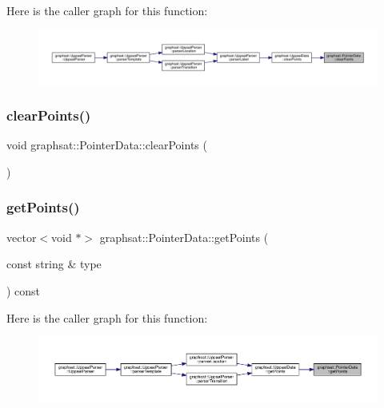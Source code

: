 Here is the caller graph for this function\+:\nopagebreak
\begin{figure}[H]
\begin{center}
\leavevmode
\includegraphics[width=350pt]{classgraphsat_1_1_pointer_data_ac609e904c48f7cc8b136eb5208bd5ffe_icgraph}
\end{center}
\end{figure}
\mbox{\label{classgraphsat_1_1_pointer_data_a2ccca7ec8ce9b07103b8796a3ed4dfec}} 
\subsubsection{\texorpdfstring{clearPoints()}{clearPoints()}\hspace{0.1cm}{\footnotesize\ttfamily [2/2]}}
{\footnotesize\ttfamily void graphsat\+::\+Pointer\+Data\+::clear\+Points (\begin{DoxyParamCaption}{ }\end{DoxyParamCaption})\hspace{0.3cm}{\ttfamily [inline]}}

\mbox{\label{classgraphsat_1_1_pointer_data_a5a5b4d08a9a16220e22e244c45f320bd}} 
\subsubsection{\texorpdfstring{getPoints()}{getPoints()}}
{\footnotesize\ttfamily vector$<$void $\ast$$>$ graphsat\+::\+Pointer\+Data\+::get\+Points (\begin{DoxyParamCaption}\item[{const string \&}]{type }\end{DoxyParamCaption}) const\hspace{0.3cm}{\ttfamily [inline]}}

Here is the caller graph for this function\+:\nopagebreak
\begin{figure}[H]
\begin{center}
\leavevmode
\includegraphics[width=350pt]{classgraphsat_1_1_pointer_data_a5a5b4d08a9a16220e22e244c45f320bd_icgraph}
\end{center}
\end{figure}


